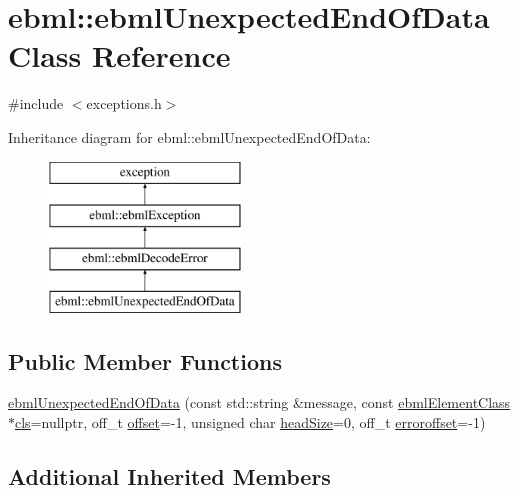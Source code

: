 \hypertarget{classebml_1_1ebmlUnexpectedEndOfData}{}\section{ebml\+:\+:ebml\+Unexpected\+End\+Of\+Data Class Reference}
\label{classebml_1_1ebmlUnexpectedEndOfData}


{\ttfamily \#include $<$exceptions.\+h$>$}

Inheritance diagram for ebml\+:\+:ebml\+Unexpected\+End\+Of\+Data\+:\begin{figure}[H]
\begin{center}
\leavevmode
\includegraphics[height=4.000000cm]{classebml_1_1ebmlUnexpectedEndOfData}
\end{center}
\end{figure}
\subsection*{Public Member Functions}
\begin{DoxyCompactItemize}
\item 
\mbox{\hyperlink{classebml_1_1ebmlUnexpectedEndOfData_a4320d2a636ca459b356e15d496cca5ef}{ebml\+Unexpected\+End\+Of\+Data}} (const std\+::string \&message, const \mbox{\hyperlink{classebml_1_1ebmlElementClass}{ebml\+Element\+Class}} $\ast$\mbox{\hyperlink{classebml_1_1ebmlDecodeError_a3568b4ea3cd5bd16b9510abfe269920f}{cls}}=nullptr, off\+\_\+t \mbox{\hyperlink{classebml_1_1ebmlDecodeError_ad32ac9b3dd52f1c11479085d9c665e0f}{offset}}=-\/1, unsigned char \mbox{\hyperlink{classebml_1_1ebmlDecodeError_a61a4d4856f0c779a1c216e45dc5a7c1e}{head\+Size}}=0, off\+\_\+t \mbox{\hyperlink{classebml_1_1ebmlDecodeError_acb525117e0109d9640fb5e8c546e9a02}{erroroffset}}=-\/1)
\end{DoxyCompactItemize}
\subsection*{Additional Inherited Members}


